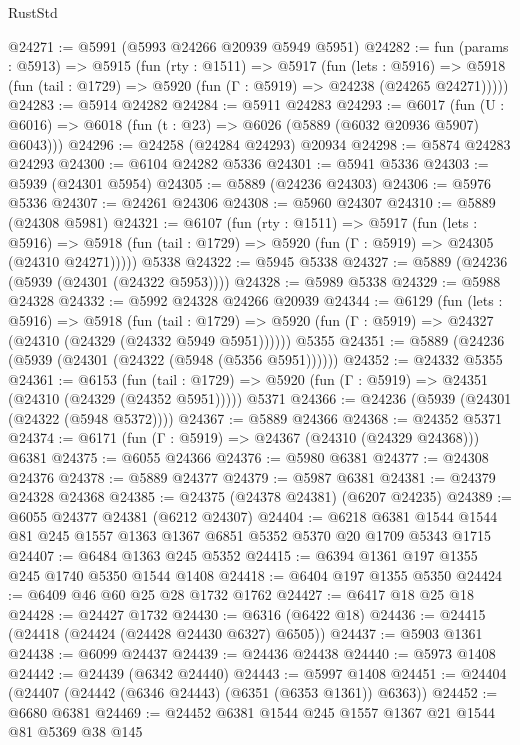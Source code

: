 \begin{lexlean}{RustStd}
\begin{coremodule}
@24271 := @5991 (@5993 @24266 @20939 @5949 @5951)
@24282 := fun (params : @5913) =>
  @5915
    (fun (rty : @1511) =>
    @5917
      (fun (lets : @5916) =>
      @5918 (fun (tail : @1729) => @5920 (fun (Γ : @5919) => @24238 (@24265 @24271)))))
@24283 := @5914 @24282
@24284 := @5911 @24283
@24293 := @6017
    (fun (U : @6016) => @6018 (fun (t : @23) => @6026 (@5889 (@6032 @20936 @5907) @6043)))
@24296 := @24258 (@24284 @24293) @20934
@24298 := @5874 @24283 @24293
@24300 := @6104 @24282 @5336
@24301 := @5941 @5336
@24303 := @5939 (@24301 @5954)
@24305 := @5889 (@24236 @24303)
@24306 := @5976 @5336
@24307 := @24261 @24306
@24308 := @5960 @24307
@24310 := @5889 (@24308 @5981)
@24321 := @6107
    (fun (rty : @1511) =>
    @5917
      (fun (lets : @5916) =>
      @5918 (fun (tail : @1729) => @5920 (fun (Γ : @5919) => @24305 (@24310 @24271)))))
    @5338
@24322 := @5945 @5338
@24327 := @5889 (@24236 (@5939 (@24301 (@24322 @5953))))
@24328 := @5989 @5338
@24329 := @5988 @24328
@24332 := @5992 @24328 @24266 @20939
@24344 := @6129
    (fun (lets : @5916) =>
    @5918
      (fun (tail : @1729) =>
      @5920 (fun (Γ : @5919) => @24327 (@24310 (@24329 (@24332 @5949 @5951))))))
    @5355
@24351 := @5889 (@24236 (@5939 (@24301 (@24322 (@5948 (@5356 @5951))))))
@24352 := @24332 @5355
@24361 := @6153
    (fun (tail : @1729) => @5920 (fun (Γ : @5919) => @24351 (@24310 (@24329 (@24352 @5951)))))
    @5371
@24366 := @24236 (@5939 (@24301 (@24322 (@5948 @5372))))
@24367 := @5889 @24366
@24368 := @24352 @5371
@24374 := @6171 (fun (Γ : @5919) => @24367 (@24310 (@24329 @24368))) @6381
@24375 := @6055 @24366
@24376 := @5980 @6381
@24377 := @24308 @24376
@24378 := @5889 @24377
@24379 := @5987 @6381
@24381 := @24379 @24328 @24368
@24385 := @24375 (@24378 @24381) (@6207 @24235)
@24389 := @6055 @24377 @24381 (@6212 @24307)
@24404 := @6218 @6381 @1544 @1544 @81 @245 @1557 @1363 @1367 @6851 @5352 @5370 @20 @1709 @5343 @1715
@24407 := @6484 @1363 @245 @5352
@24415 := @6394 @1361 @197 @1355 @245 @1740 @5350 @1544 @1408
@24418 := @6404 @197 @1355 @5350
@24424 := @6409 @46 @60 @25 @28 @1732 @1762
@24427 := @6417 @18 @25 @18
@24428 := @24427 @1732
@24430 := @6316 (@6422 @18)
@24436 := @24415 (@24418 (@24424 (@24428 @24430 @6327) @6505))
@24437 := @5903 @1361
@24438 := @6099 @24437
@24439 := @24436 @24438
@24440 := @5973 @1408
@24442 := @24439 (@6342 @24440)
@24443 := @5997 @1408
@24451 := @24404 (@24407 (@24442 (@6346 @24443) (@6351 (@6353 @1361)) @6363))
@24452 := @6680 @6381
@24469 := @24452
    @6381
    @1544
    @245
    @1557
    @1367
    @21
    @1544
    @81
    @5369
    @38
    @145

\end{coremodule}
\end{lexlean}
